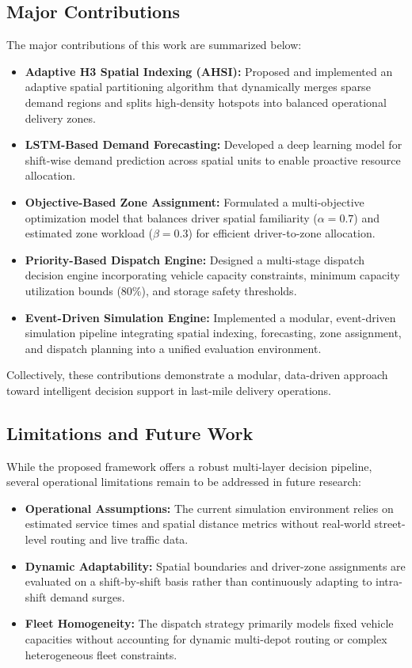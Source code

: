 \documentclass{article}
\begin{document}
\subsection{Major Contributions}
The major contributions of this work are summarized below:

\begin{itemize}
    \item \textbf{Adaptive H3 Spatial Indexing (AHSI):} Proposed and implemented an adaptive spatial partitioning algorithm that dynamically merges sparse demand regions and splits high-density hotspots into balanced operational delivery zones.
    \item \textbf{LSTM-Based Demand Forecasting:} Developed a deep learning model for shift-wise demand prediction across spatial units to enable proactive resource allocation.
    \item \textbf{Objective-Based Zone Assignment:} Formulated a multi-objective optimization model that balances driver spatial familiarity ($\alpha = 0.7$) and estimated zone workload ($\beta = 0.3$) for efficient driver-to-zone allocation.
    \item \textbf{Priority-Based Dispatch Engine:} Designed a multi-stage dispatch decision engine incorporating vehicle capacity constraints, minimum capacity utilization bounds ($80\%$), and storage safety thresholds.
    \item \textbf{Event-Driven Simulation Engine:} Implemented a modular, event-driven simulation pipeline integrating spatial indexing, forecasting, zone assignment, and dispatch planning into a unified evaluation environment.
\end{itemize}

Collectively, these contributions demonstrate a modular, data-driven approach toward intelligent decision support in last-mile delivery operations.

\subsection{Limitations and Future Work}
While the proposed framework offers a robust multi-layer decision pipeline, several operational limitations remain to be addressed in future research:

\begin{itemize}
    \item \textbf{Operational Assumptions:} The current simulation environment relies on estimated service times and spatial distance metrics without real-world street-level routing and live traffic data.
    \item \textbf{Dynamic Adaptability:} Spatial boundaries and driver-zone assignments are evaluated on a shift-by-shift basis rather than continuously adapting to intra-shift demand surges.
    \item \textbf{Fleet Homogeneity:} The dispatch strategy primarily models fixed vehicle capacities without accounting for dynamic multi-depot routing or complex heterogeneous fleet constraints.
\end{itemize}
\end{document}

